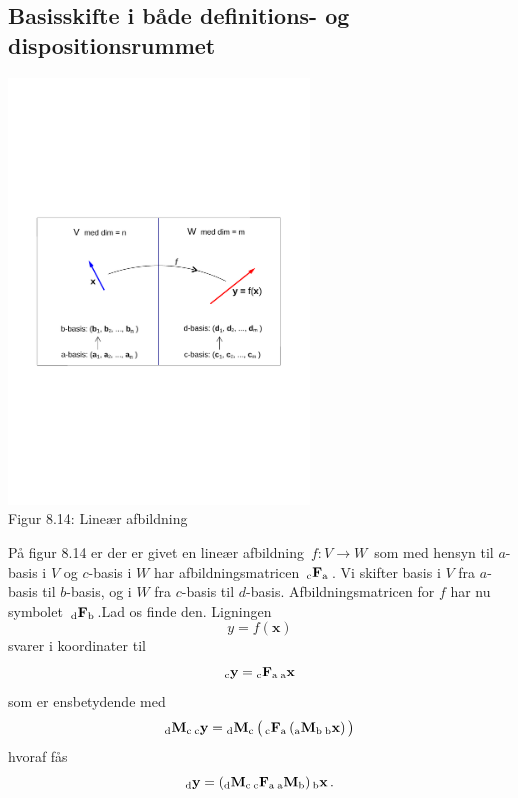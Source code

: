 \subsection{Basisskifte i både definitions- og dispositionsrummet}
\begin{center}
		\includegraphics[trim=2cm 9cm 2cm
 9cm,width=0.60\textwidth,clip]{linAfbVW4.pdf}
  \\Figur 8.14: Lineær afbildning 
\end{center}

På figur 8.14 er der er givet en lineær afbildning $\,f:V\rightarrow W\,$ som med hensyn til $a$-basis i $V$ og $c$-basis i $W$ har afbildningsmatricen $\,{_\mathrm{c}\mathbf{F}_\mathrm{a}}\,$. Vi skifter basis i $V$ fra $a$-basis til $b$-basis, og i $W$ fra $c$-basis til $d$-basis. Afbildningsmatricen for $f$ har nu symbolet $\,{_\mathrm{d}\mathbf{F}_\mathrm{b}}\,$.Lad os finde den. Ligningen 
$$
y = f(\mathbf x)$$ svarer i koordinater til
$${_\mathrm{c}\mathbf{y}}={_\mathrm{c}\mathbf{F}_\mathrm{a}}\,{_\mathrm{a}\mathbf{x}} $$
som er ensbetydende med
$${_\mathrm{d}\mathbf{M}_\mathrm{c}}\,{_\mathrm{c}\mathbf{y}}={_\mathrm{d}\mathbf{M}_\mathrm{c}}\,\big(\,{_\mathrm{c}\mathbf{F}_\mathrm{a}}\,({_\mathrm{a}\mathbf{M}_\mathrm{b}}\,{_\mathrm{b}\mathbf{x}})\,\big)$$ hvoraf fås
$${_\mathrm{d}\mathbf{y}}=({_\mathrm{d}\mathbf{M}_\mathrm{c}}\,{_\mathrm{c}\mathbf{F}_\mathrm{a}}\,{_\mathrm{a}\mathbf{M}_\mathrm{b}})\,{_\mathrm{b}\mathbf{x}}\,.$$

